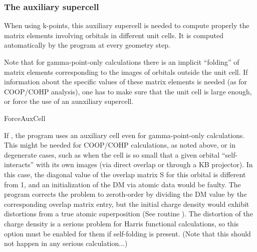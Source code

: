   \subsubsection{The auxiliary supercell}
  
  When using k-points, this auxiliary supercell is needed to compute properly
  the matrix elements involving orbitals in different unit cells.
  It is computed automatically by the program at every geometry step.
  
  Note that for gamma-point-only calculations there is an implicit
  ``folding'' of matrix elements corresponding to the images of orbitals
  outside the unit cell. If information about the specific values of
  these matrix elements is needed (as for COOP/COHP analysis), one has
  to make sure that the unit cell is large enough, or force the use
  of an aunxiliary supercell.
  
  \begin{fdflogicalF}{ForceAuxCell}
  
  If \fdftrue, the program uses an auxiliary cell even for gamma-point-only
  calculations. This might be needed for COOP/COHP calculations, as
  noted above,  or in degenerate cases, such as when the cell is so
  small that a given orbital ``self-interacts'' with its own images (via
  direct overlap or through a KB projector). In this case, the diagonal
  value of the overlap matrix S for this orbital is different from 1, and an
  initialization of the DM via atomic data would be faulty. The
  program corrects the problem to zeroth-order by dividing the DM value
  by the corresponding overlap matrix entry, but the initial charge
  density would exhibit distortions from a true atomic superposition
  (See routine ). The distortion of the charge density
  is a serious problem for Harris functional calculations, so this
  option must be enabled for them if self-folding is present. (Note that
  this should not happen in any serious calculation...)
  
  \end{fdflogicalF}
    
